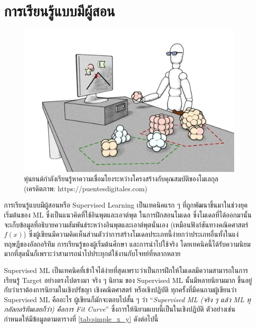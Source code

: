 

\chapter{การเรียนรู้แบบมีผู้สอน}
\label{ch:sup_ml}

\begin{figure}[htbp]
    \centering
    \includegraphics[width=0.9\linewidth]{fig/supervised_ml.png}
    \caption{หุ่นยนต์กำลังเรียนรู้หาความเชื่อมโยงระหว่างโครงสร้างกับคุณสมบัติของโมเลกุล (เครดิตภาพ: https://puentesdigitales.com)}
    \label{fig:supervised_ml}
\end{figure}

การเรียนรู้แบบมีผู้สอนหรือ Supervised Learning เป็นเทคนิคแรก ๆ ที่ถูกพัฒนาขึ้นมาในช่วงยุคเริ่มต้นของ ML ซึ่งเป็นแนวคิดที่ใช้อินพุตและเอาต์พุต%
ในการฝึกสอนโมเดล ซึ่งโมเดลที่ได้ออกมานั้นจะเก็บข้อมูลที่อธิบายความสัมพันธ์ระหว่างอินพุตและเอาต์พุตนั่นเอง (เหมือนฟังก์ชันทางคณิคศาสตร์ $f(x)$) 
ซึ่งผู้เขียนมีความคิดเห็นส่วนตัวว่าการสร้างโมเดลประเภทนี้ง่ายกว่าประเภทอื่นทั้งในแง่ทฤษฎีของอัลกอริทึม การเรียนรู้ของผู้เริ่มต้นศึกษา และการนำไปใช้จริง 
โดยเทคนิคนี้ได้รับความนิยมมากที่สุดนั่นก็เพราะว่าสามารถนำไปประยุกต์ใช้งานกับโจทย์ที่หลากหลาย

Supervised ML เป็นเทคนิคที่เข้าใจได้ง่ายที่สุดเพราะว่าเป็นการฝึกให้โมเดลมีความสามารถในการเรียนรู้ Target อย่างตรงไปตรงมา จริง ๆ นิยาม%
ของ Supervised ML นั้นมีหลายนิยามมาก ขึ้นอยู่กับว่าเราต้องการนิยามในเชิงปรัชญา เชิงคณิตศาสตร์ หรือเชิงปฏิบัติ ทุกครั้งที่มีคนถามผู้เขียนว่า 
Supervised ML คืออะไร ผู้เขียนก็มักจะตอบไปสั้น ๆ ว่า \enquote{\textit{Supervised ML (จริง ๆ แล้ว ML ทุกอัลกอริทึมเลยก็ว่า) 
คือการ Fit Curve}} ซึ่งการให้นิยามแบบนี้เป็นในเชิงปฏิบัติ ตัวอย่างเช่น กำหนดให้มีข้อมูลตามตารางที่ \ref{tab:simple_x_y} ดังต่อไปนี้

